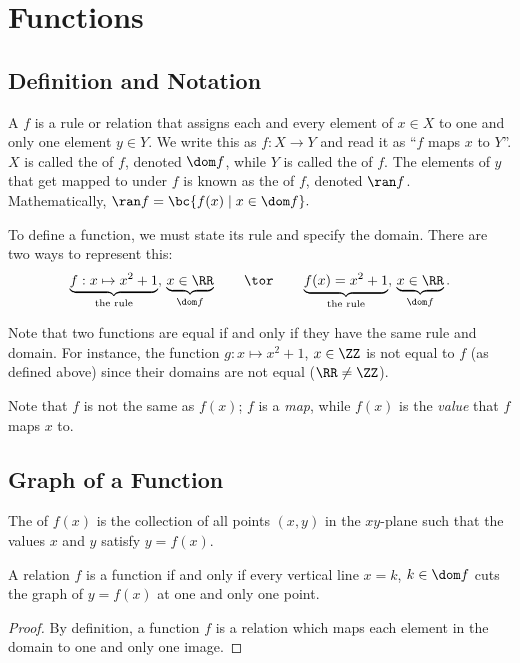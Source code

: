 \chapter{Functions}\label{chap:Functions}

\section{Definition and Notation}

\begin{definition}
    A  $f$ is a rule or relation that assigns each and every element of $x \in X$ to one and only one element $y \in Y$. We write this as $f : X \to Y$ and read it as ``$f$ maps $x$ to $Y$''. $X$ is called the  of $f$, denoted $\dom f$, while $Y$ is called the  of $f$. The elements of $y$ that get mapped to under $f$ is known as the  of $f$, denoted $\ran f$. Mathematically, $\ran f = \bc{f(x) \mid x \in \dom f}.$
\end{definition}

To define a function, we must state its rule and specify the domain. There are two ways to represent this: \[\underbrace{f : x \mapsto x^2 + 1}_{\text{the rule}}, \, \underbrace{x \in \RR}_{\dom f} \qquad \tor \qquad \underbrace{f(x) = x^2 + 1}_{\text{the rule}}, \, \underbrace{x \in \RR}_{\dom f}.\]

Note that two functions are equal if and only if they have the same rule and domain. For instance, the function $g : x \mapsto x^2 + 1$, $x \in \ZZ$ is not equal to $f$ (as defined above) since their domains are not equal ($\RR \neq \ZZ$).

Note that $f$ is not the same as $f(x)$; $f$ is a \textit{map}, while $f(x)$ is the \textit{value} that $f$ maps $x$ to.

\section{Graph of a Function}

\begin{definition}
    The  of $f(x)$ is the collection of all points $(x, y)$ in the $xy$-plane such that the values $x$ and $y$ satisfy $y = f(x)$.
\end{definition}

\begin{proposition}
    A relation $f$ is a function if and only if every vertical line $x = k$, $k \in \dom f$ cuts the graph of $y = f(x)$ at one and only one point.
\end{proposition}
\begin{proof}
    By definition, a function $f$ is a relation which maps each element in the domain to one and only one image.
\end{proof}


